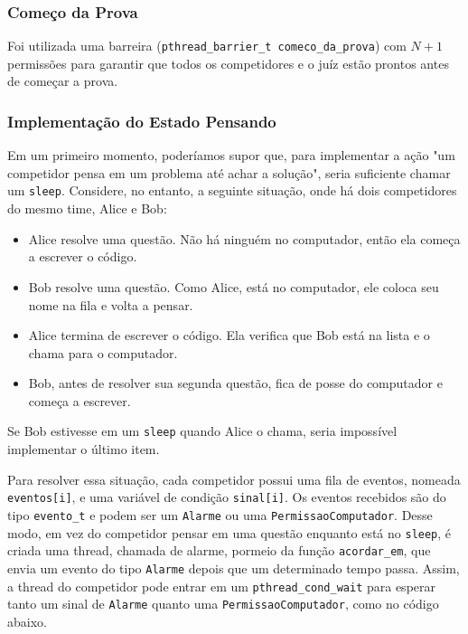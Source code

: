 \documentclass[11pt]{article}
\newcommand{\code}{\lstinline[mathescape=true]}
\begin{document}
\subsubsection{Começo da Prova}
Foi utilizada uma barreira (\code{pthread_barrier_t comeco_da_prova}) com $N + 1$ permissões para garantir que todos os competidores e o juíz
estão prontos antes de começar a prova.

\subsubsection{Implementação do Estado Pensando}
Em um primeiro momento, poderíamos supor que, para implementar a ação "um competidor pensa em um
problema até achar a solução", seria suficiente chamar um \code{sleep}. Considere, no entanto, a
seguinte situação, onde há dois competidores do mesmo time, Alice e Bob:

\begin{itemize}
	\item Alice resolve uma questão. Não há ninguém no computador, então ela começa a escrever o
		código.
	\item Bob resolve uma questão. Como Alice, está no computador, ele coloca seu nome na fila e
		volta a pensar.
	\item Alice termina de escrever o código. Ela verifica que Bob está na lista e o chama para o
		computador.
	\item Bob, antes de resolver sua segunda questão, fica de posse do computador e começa a
		escrever.
\end{itemize}

Se Bob estivesse em um \code{sleep} quando Alice o chama, seria impossível implementar o último item.

Para resolver essa situação, cada competidor possui uma fila de eventos, nomeada \code{eventos[i]}, e
uma variável de condição \code{sinal[i]}. Os eventos recebidos são do tipo \code{evento_t} e podem
ser um \code{Alarme} ou uma \code{PermissaoComputador}. Desse modo, em vez do competidor pensar em
uma questão enquanto está no \code{sleep}, é criada uma thread, chamada de alarme, pormeio da função
\code{acordar_em}, que envia um evento do tipo \code{Alarme} depois que um determinado tempo passa.
Assim, a thread do competidor pode entrar em um \code{pthread_cond_wait} para esperar tanto um sinal
de \code{Alarme} quanto uma \code{PermissaoComputador}, como no código abaixo.
\end{document}
